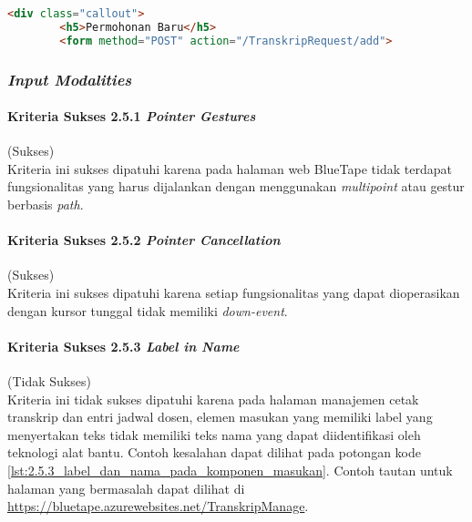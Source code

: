 \begin{lstlisting}[frame=single, label={lst:2.4.10_heading_tidak_tepat}, language=HTML, caption=Kriteria Sukses 2.4.10 - Penggunaan \textit{Heading} Tidak Tepat]
    <div class="callout">
        <h5>Permohonan Baru</h5>
        <form method="POST" action="/TranskripRequest/add">
\end{lstlisting}

\subsubsection{\textit{Input Modalities}}
\label{subsubsec:kepatuhan_bluetape_input_modalities}

\paragraph{Kriteria Sukses 2.5.1 \textit{Pointer Gestures}}
\label{par:kepatuhan_bluetape_kriteria_sukses_2.5.1}
(Sukses)\\

Kriteria ini sukses dipatuhi karena pada halaman web BlueTape tidak terdapat fungsionalitas yang harus dijalankan dengan menggunakan \textit{multipoint} atau gestur berbasis \textit{path}.

\paragraph{Kriteria Sukses 2.5.2 \textit{Pointer Cancellation}}
\label{par:kepatuhan_bluetape_kriteria_sukses_2.5.2}
(Sukses)\\

Kriteria ini sukses dipatuhi karena setiap fungsionalitas yang dapat dioperasikan dengan kursor tunggal tidak memiliki \textit{down-event}.

\paragraph{Kriteria Sukses 2.5.3 \textit{Label in Name}}
\label{par:kepatuhan_bluetape_kriteria_sukses_2.5.3}
(Tidak Sukses)\\

Kriteria ini tidak sukses dipatuhi karena pada halaman manajemen cetak transkrip dan entri jadwal dosen, elemen masukan yang memiliki label yang menyertakan teks tidak memiliki teks nama yang dapat diidentifikasi oleh teknologi alat bantu. Contoh kesalahan dapat dilihat pada potongan kode \ref{lst:2.5.3_label_dan_nama_pada_komponen_masukan}. Contoh tautan untuk halaman yang bermasalah dapat dilihat di \url{https://bluetape.azurewebsites.net/TranskripManage}.


